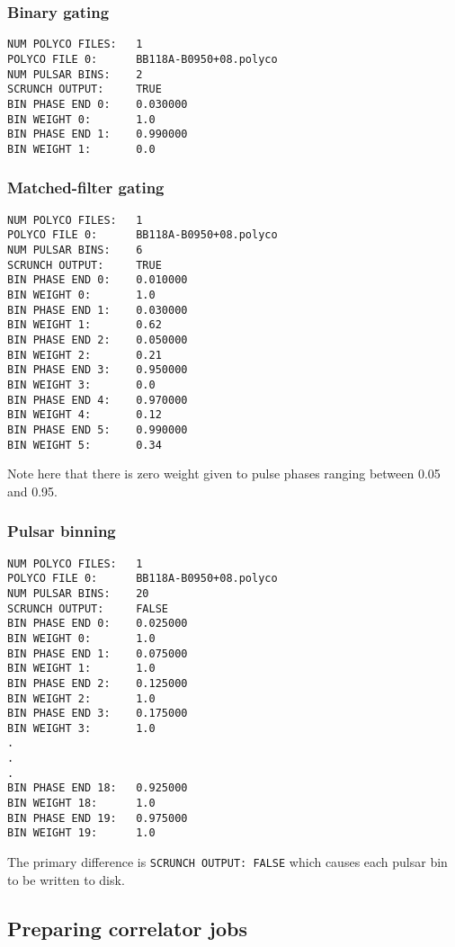 \subsubsection{Binary gating}

\begin{verbatim}
NUM POLYCO FILES:   1
POLYCO FILE 0:      BB118A-B0950+08.polyco
NUM PULSAR BINS:    2
SCRUNCH OUTPUT:     TRUE
BIN PHASE END 0:    0.030000
BIN WEIGHT 0:       1.0
BIN PHASE END 1:    0.990000
BIN WEIGHT 1:       0.0
\end{verbatim}

\subsubsection{Matched-filter gating}

\begin{verbatim}
NUM POLYCO FILES:   1
POLYCO FILE 0:      BB118A-B0950+08.polyco
NUM PULSAR BINS:    6
SCRUNCH OUTPUT:     TRUE
BIN PHASE END 0:    0.010000
BIN WEIGHT 0:       1.0
BIN PHASE END 1:    0.030000
BIN WEIGHT 1:       0.62
BIN PHASE END 2:    0.050000
BIN WEIGHT 2:       0.21
BIN PHASE END 3:    0.950000
BIN WEIGHT 3:       0.0
BIN PHASE END 4:    0.970000
BIN WEIGHT 4:       0.12
BIN PHASE END 5:    0.990000
BIN WEIGHT 5:       0.34
\end{verbatim}

Note here that there is zero weight given to pulse phases ranging between 0.05 and 0.95.

\subsubsection{Pulsar binning}

\begin{verbatim}
NUM POLYCO FILES:   1
POLYCO FILE 0:      BB118A-B0950+08.polyco
NUM PULSAR BINS:    20
SCRUNCH OUTPUT:     FALSE
BIN PHASE END 0:    0.025000
BIN WEIGHT 0:       1.0
BIN PHASE END 1:    0.075000
BIN WEIGHT 1:       1.0
BIN PHASE END 2:    0.125000
BIN WEIGHT 2:       1.0
BIN PHASE END 3:    0.175000
BIN WEIGHT 3:       1.0
.
.
.
BIN PHASE END 18:   0.925000
BIN WEIGHT 18:      1.0
BIN PHASE END 19:   0.975000
BIN WEIGHT 19:      1.0
\end{verbatim}

The primary difference is {\tt SCRUNCH OUTPUT:     FALSE} which causes each pulsar bin to be written to disk.

\subsection{Preparing correlator jobs}


